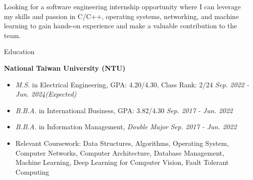 \documentclass{resume} %
\newcommand{\itab}[1]{\hspace{0em}\rlap{#1}}
\begin{document}


Looking for a software engineering internship opportunity where I can leverage my skills and passion in C/C++, operating systems, networking, and machine learning to gain hands-on experience and make a valuable contribution to the team.



\begin{rSection}{ Education}


{\bf National Taiwan University (NTU)}
\begin{itemize}
    \item \textit{M.S.} in {Electrical Engineering}, GPA: 4.20/4.30, Class Rank: 2/24  \hfill \textit{Sep. 2022 - Jun. 2024(Expected)}
    \item \textit{B.B.A.} in {International Business}, GPA: 3.82/4.30 \hfill \textit{Sep. 2017 - Jun. 2022}
    \item \textit{B.B.A.} in {Information Management}, \textit{Double Major} \hfill \textit{Sep. 2017 - Jun. 2022}
    \item {Relevant Coursework}: Data Structures,  Algorithms, Operating System, Computer Networks, Computer Architecture, Database Management, Machine Learning, Deep Learning for Computer Vision, Fault Tolerant Computing
\end{itemize}

\end{rSection}
\end{document}
